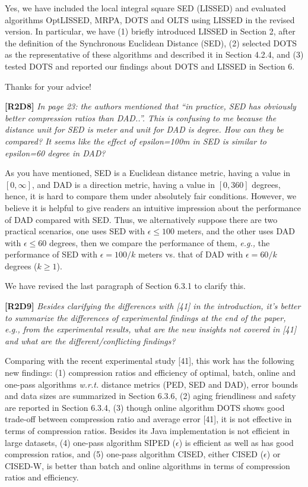 \documentclass{letter}
\newcommand{\eg}{\emph{e.g.,}\xspace}
\newcommand{\wrt}{\emph{w.r.t.}\xspace}
\begin{document}
{{Yes, we have included the local integral square SED (LISSED) and evaluated algorithms OptLISSED, MRPA, DOTS and OLTS using LISSED in the revised version. In particular, we have (1) briefly introduced LISSED in Section 2, after the definition of the Synchronous Euclidean Distance (SED), (2) selected DOTS as the representative of these algorithms and described it in Section 4.2.4, and (3) tested DOTS and reported our findings about DOTS and LISSED in Section 6.

Thanks for your advice!


\textbf{[R2D8]} \emph{In page 23: the authors mentioned that “in practice, SED has obviously better compression ratios than DAD..”. This is confusing to me because the distance unit for SED is meter and unit for DAD is degree. How can they be compared? It seems like the effect of epsilon=100m in SED is similar to epsilon=60 degree in DAD?}

As you have mentioned, SED is a Euclidean distance metric, having a value in $[0, \infty]$, and DAD is a direction metric, having a value in $[0, 360]$ degrees, hence, it is hard to compare them under absolutely fair conditions. However, we believe it is helpful to give readers an intuitive impression about the performance of DAD compared with SED. Thus, we alternatively suppose there are two practical scenarios, one uses SED with $\epsilon  \le  100$ meters, and the other uses DAD with $\epsilon \le 60$ degrees, then we compare the performance of them, \eg the performance of SED with $\epsilon=100/k$ meters vs. that of DAD with $\epsilon=60/k$ degrees ($k\ge 1$). 


{We have revised the last paragraph of Section 6.3.1 to clarify this. }

\textbf{[R2D9]} \emph{Besides clarifying the differences with [41] in the introduction, it’s better to summarize the differences of experimental findings at the end of the paper, e.g., from the experimental results, what are the new insights not covered in [41] and what are the different/conflicting findings?}

Comparing with the recent experimental study [41], this work has the following new findings: 
	(1) compression ratios and efficiency of optimal, batch, online and one-pass algorithms \wrt distance metrics (PED, SED and DAD), error bounds and data sizes are summarized in Section 6.3.6, 
	(2) aging friendliness and safety are reported in Section 6.3.4,
	(3) though online algorithm DOTS shows good trade-off between compression ratio and average error [41], it is not effective in terms of compression ratios. Besides its Java implementation is not efficient in large datasets,  
	(4) one-pass algorithm SIPED ($\epsilon$) is efficient as well as has good compression ratios, and 
	(5) one-pass algorithm CISED, either CISED ($\epsilon$) or CISED-W, is better than batch and online algorithms in terms of compression ratios and efficiency.

}}
\end{document}
